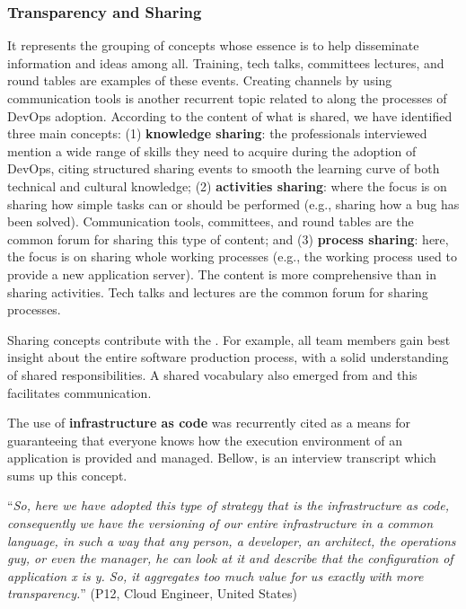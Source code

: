 \subsubsection{Transparency and Sharing} It represents the grouping of concepts
whose essence is to help disseminate information and ideas among all. Training,
tech talks, committees lectures, and round tables
are examples of these events. Creating
channels by using communication tools is another recurrent topic
related to  along the processes of DevOps adoption.
According to the content of what is shared, we have identified three main concepts:
(1) {\bf knowledge sharing}: the professionals interviewed mention a wide range of
skills they need to acquire during the adoption of DevOps, citing
structured sharing events to smooth the learning curve of both technical and
cultural knowledge; (2) {\bf activities sharing}: where the focus is on sharing how simple tasks can or
should be performed (e.g., sharing how a bug has been solved). Communication tools,
committees, and round tables are the common forum for sharing this type of content;
and (3) {\bf process sharing}: here, the focus is on sharing whole working processes
(e.g., the working process used to provide a new application server). The
content is more comprehensive than in sharing activities. Tech talks and
lectures are the common forum for sharing processes.

Sharing concepts contribute with the \cc. For example,
all team members gain best insight about the entire software production
process, with a solid understanding of shared responsibilities. A shared vocabulary also
emerged from  and this facilitates communication.

The use of \textbf{infrastructure as code} was
recurrently cited as a means for guaranteeing that everyone knows how the execution environment of
an application is provided and managed. Bellow, is an interview
transcript which sums up this concept.

\begin{mq}
``\emph{So, here we have adopted this type of strategy that is the infrastructure as code,
consequently we have the versioning of our entire
infrastructure in a common language, in such a way that any person, a
developer, an architect, the operations guy, or even the manager, he can look
at it and describe that the configuration of application x is y. So, it
aggregates too much value for us exactly with more transparency.}'' (P12, Cloud Engineer, United States)
\end{mq}

